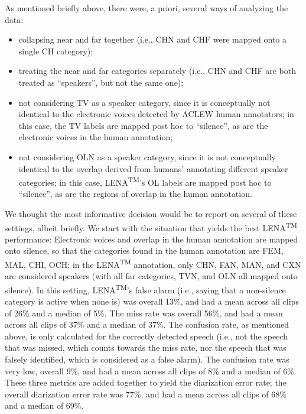 \documentclass[english,floatsintext,man]{apa6}
\providecommand{\tightlist}{%
  \setlength{\itemsep}{0pt}\setlength{\parskip}{0pt}}
\begin{document}
As mentioned briefly above, there were, a priori, several ways of
analyzing the data:

\begin{itemize}
\tightlist
\item
  collapsing near and far together (i.e., CHN and CHF were mapped onto a
  single CH category);
\item
  treating the near and far categories separately (i.e., CHN and CHF are
  both treated as \enquote{speakers}, but not the same one);
\item
  not considering TV as a speaker category, since it is conceptually not
  identical to the electronic voices detected by ACLEW human annotators;
  in this case, the TV labels are mapped post hoc to \enquote{silence},
  as are the electronic voices in the human annotation;
\item
  not considering OLN as a speaker category, since it is not
  conceptually identical to the overlap derived from humans' annotating
  different speaker categories; in this case, LENA\textsuperscript{TM}'s
  OL labels are mapped post hoc to \enquote{silence}, as are the regions
  of overlap in the human annotation.
\end{itemize}

We thought the most informative decision would be to report on several
of these settings, albeit briefly. We start with the situation that
yields the best LENA\textsuperscript{TM} performance: Electronic voices
and overlap in the human annotation are mapped onto silence, so that the
categories found in the human annotation are FEM, MAL, CHI, OCH; in the
LENA\textsuperscript{TM} annotation, only CHN, FAN, MAN, and CXN are
considered speakers (with all far categories, TVN, and OLN all mapped
onto silence). In this setting, LENA\textsuperscript{TM}'s false alarm
(i.e., saying that a non-silence category is active when none is) was
overall 13\%, and had a mean across all clips of 26\% and a median of
5\%. The miss rate was overall 56\%, and had a mean across all clips of
37\% and a median of 37\%. The confusion rate, as mentioned above, is
only calculated for the correctly detected speech (i.e., not the speech
that was missed, which counts towards the miss rate, nor the speech that
was falsely identified, which is considered as a false alarm). The
confusion rate was very low, overall 9\%, and had a mean across all
clips of 8\% and a median of 6\%. These three metrics are added together
to yield the diarization error rate; the overall diarization error rate
was 77\%, and had a mean across all clips of 68\% and a median of 69\%.
\end{document}
